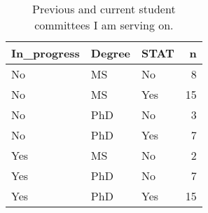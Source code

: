 \begin{table}[h]
\centering
\begin{tabular}{lllr}
  \hline
In\_progress & Degree & STAT & n \\ 
  \hline
No & MS & No &   8 \\ 
  No & MS & Yes &  15 \\ 
  No & PhD & No &   3 \\ 
  No & PhD & Yes &   7 \\ 
  Yes & MS & No &   2 \\ 
  Yes & PhD & No &   7 \\ 
  Yes & PhD & Yes &  15 \\ 
   \hline
\end{tabular}
\caption{Previous and current student committees I am serving on.} 
\label{tab:committees}
\end{table}
